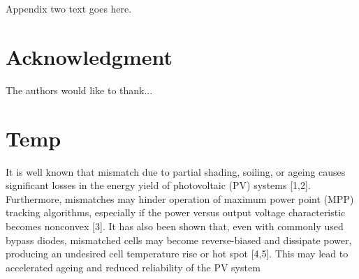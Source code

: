 \documentclass[journal]{IEEEtran}
\begin{document}
\section{}
Appendix two text goes here.


\section*{Acknowledgment}


The authors would like to thank...


\section*{Temp}
It is well known that mismatch due to partial shading, soiling, or ageing causes significant losses
in the energy yield of photovoltaic (PV) systems [1,2]. Furthermore, mismatches may hinder operation
of maximum power point (MPP) tracking algorithms, especially if the power versus output voltage
characteristic becomes nonconvex [3]. It has also been shown that, even with commonly used bypass
diodes, mismatched cells may become reverse-biased and dissipate power, producing an undesired
cell temperature rise or hot spot [4,5]. This may lead to accelerated ageing and reduced reliability of
the PV system




\end{document}
